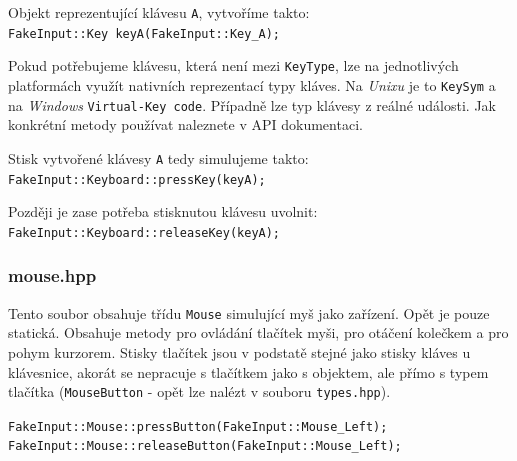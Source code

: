 \documentclass[12pt]{article}
\newcommand{\code}[1]{\texttt{#1}}
\begin{document}
        \begin{center}
            \begin{minipage}{0.7\textwidth}
                Objekt reprezentující klávesu \code{A}, vytvoříme takto:\\
                \code{FakeInput::Key keyA(FakeInput::Key\_A);}
            \end{minipage}
        \end{center}

    Pokud potřebujeme klávesu, která není mezi \code{KeyType}, lze na jednotlivých platformách využít nativních reprezentací typy kláves. Na \emph{Unixu} je to \code{KeySym} a na \emph{Windows} \code{Virtual-Key code}. Případně lze  typ klávesy z reálné události. Jak konkrétní metody používat naleznete v API dokumentaci.

        \begin{center}
            \begin{minipage}{0.7\textwidth}
                Stisk vytvořené klávesy \code{A} tedy simulujeme takto:\\
                \code{FakeInput::Keyboard::pressKey(keyA);}\\
            \end{minipage}

            \begin{minipage}{0.7\textwidth}
                Později je zase potřeba stisknutou klávesu uvolnit:\\
                \code{FakeInput::Keyboard::releaseKey(keyA);}
            \end{minipage}
        \end{center}

    \subsubsection{mouse.hpp}
    Tento soubor obsahuje třídu \code{Mouse} simulující myš jako zařízení. Opět je pouze statická. Obsahuje metody pro ovládání tlačítek myši, pro otáčení kolečkem a pro pohym kurzorem. Stisky tlačítek jsou v podstatě stejné jako stisky kláves u klávesnice, akorát se nepracuje s tlačítkem jako s objektem, ale přímo s typem tlačítka (\code{MouseButton} - opět lze nalézt v souboru \code{types.hpp}).

        \begin{center}
            \begin{minipage}{0.85\textwidth}
                \code{FakeInput::Mouse::pressButton(FakeInput::Mouse\_Left);}
                \code{FakeInput::Mouse::releaseButton(FakeInput::Mouse\_Left);}
            \end{minipage}
        \end{center}
\end{document}
